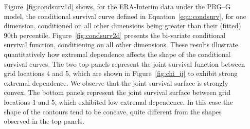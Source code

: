 Figure~\ref{fig:condsurv1d} shows, for the ERA-Interim data under the PRG--G model,  
    the conditional survival curve defined in Equation~\ref{eqn:condsurv}, for one dimension, 
    conditioned on all other dimensions being greater than their (fitted) $90$th percentile. 
    Figure~\ref{fig:condsurv2d} presents the bi-variate conditional survival function,
    conditioning on all other dimensions.  These results illustrate quantitatively how extremal dependence
    affects the shape of the conditional survival curves.  The two top panels represent the joint survival function 
    between grid locations 4 and 5, which are shown in Figure~\ref{fig:chi_ij} to exhibit strong
    extremal dependence.  We observe that the joint survival surface 
    is strongly convex.  The bottom panels represent the joint survival surface between grid locations 1 and 5, 
    which exhibited low extremal dependence.  In this case the shape of the contours tend to be concave, quite different from the shapes observed in the top panels.
